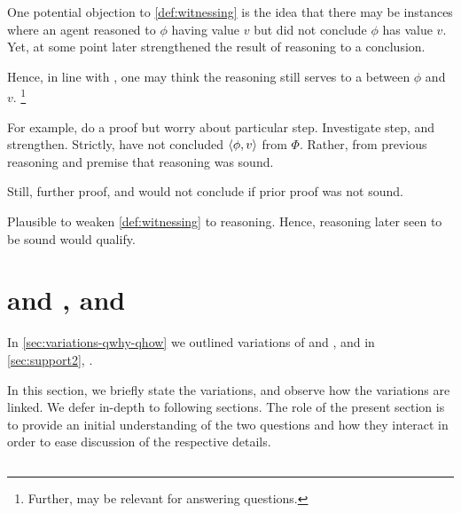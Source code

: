 \begin{note}
  One potential objection to \autoref{def:witnessing} is the idea that there may be instances where an agent reasoned to \(\phi\) having value \(v\) but did not conclude \(\phi\) has value \(v\).
  Yet, at some point later strengthened the result of reasoning to a conclusion.

  Hence, in line with \supportII{}, one may think the reasoning still serves to  a  \ros{} between \(\phi\) and \(v\).%
  \footnote{
    Further, may be relevant for answering questions.
  }

  For example, do a proof but worry about particular step.
  Investigate step, and strengthen.
  Strictly, have not concluded \(\langle \phi, v \rangle\) from \(\Phi\).
  Rather, from previous reasoning and premise that reasoning was sound.

  Still, further proof, and would not conclude if prior proof was not sound.

  Plausible to weaken \autoref{def:witnessing} to reasoning.
  Hence, reasoning later seen to be sound would qualify.
\end{note}

\section{\qWhyVnP{} and \qHowV{}, and \issueConstraint{}}
\label{sec:variants-initial}

\begin{note}
  In \autoref{sec:variations-qwhy-qhow} we outlined variations of \qWhy{} and \qHow{}, and in \autoref{sec:support2}, \support{}.

  In this section, we briefly state the variations, and observe how the variations are linked.
  We defer in-depth to following sections.
  The role of the present section is to provide an initial understanding of the two questions and how they interact in order to ease discussion of the respective details.
\end{note}

\subsection{\qWhyVnP{}}
\label{sec:variants-initial:qwhyvnp}

